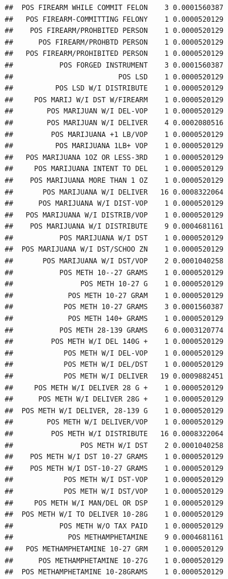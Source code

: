 \documentclass[]{book}
\begin{document}
\begin{verbatim}
##  POS FIREARM WHILE COMMIT FELON    3 0.0001560387
##   POS FIREARM-COMMITTING FELONY    1 0.0000520129
##    POS FIREARM/PROHBITED PERSON    1 0.0000520129
##      POS FIREARM/PROHBTD PERSON    1 0.0000520129
##   POS FIREARM/PROHIBITED PERSON    1 0.0000520129
##           POS FORGED INSTRUMENT    3 0.0001560387
##                         POS LSD    1 0.0000520129
##          POS LSD W/I DISTRIBUTE    1 0.0000520129
##     POS MARIJ W/I DST W/FIREARM    1 0.0000520129
##        POS MARIJUAN W/I DEL-VOP    1 0.0000520129
##        POS MARIJUAN W/I DELIVER    4 0.0002080516
##         POS MARIJUANA +1 LB/VOP    1 0.0000520129
##          POS MARIJUANA 1LB+ VOP    1 0.0000520129
##   POS MARIJUANA 1OZ OR LESS-3RD    1 0.0000520129
##     POS MARIJUANA INTENT TO DEL    1 0.0000520129
##    POS MARIJUANA MORE THAN 1 OZ    1 0.0000520129
##       POS MARIJUANA W/I DELIVER   16 0.0008322064
##      POS MARIJUANA W/I DIST-VOP    1 0.0000520129
##   POS MARIJUANA W/I DISTRIB/VOP    1 0.0000520129
##    POS MARIJUANA W/I DISTRIBUTE    9 0.0004681161
##           POS MARIJUANA W/I DST    1 0.0000520129
##  POS MARIJUANA W/I DST/SCHOO ZN    1 0.0000520129
##       POS MARIJUANA W/I DST/VOP    2 0.0001040258
##           POS METH 10--27 GRAMS    1 0.0000520129
##                POS METH 10-27 G    1 0.0000520129
##             POS METH 10-27 GRAM    1 0.0000520129
##            POS METH 10-27 GRAMS    3 0.0001560387
##             POS METH 140+ GRAMS    1 0.0000520129
##           POS METH 28-139 GRAMS    6 0.0003120774
##         POS METH W/I DEL 140G +    1 0.0000520129
##            POS METH W/I DEL-VOP    1 0.0000520129
##            POS METH W/I DEL/DST    1 0.0000520129
##            POS METH W/I DELIVER   19 0.0009882451
##     POS METH W/I DELIVER 28 G +    1 0.0000520129
##      POS METH W/I DELIVER 28G +    1 0.0000520129
##  POS METH W/I DELIVER, 28-139 G    1 0.0000520129
##        POS METH W/I DELIVER/VOP    1 0.0000520129
##         POS METH W/I DISTRIBUTE   16 0.0008322064
##                POS METH W/I DST    2 0.0001040258
##    POS METH W/I DST 10-27 GRAMS    1 0.0000520129
##    POS METH W/I DST-10-27 GRAMS    1 0.0000520129
##            POS METH W/I DST-VOP    1 0.0000520129
##            POS METH W/I DST/VOP    1 0.0000520129
##     POS METH W/I MAN/DEL OR DSP    1 0.0000520129
##  POS METH W/I TO DELIVER 10-28G    1 0.0000520129
##           POS METH W/O TAX PAID    1 0.0000520129
##             POS METHAMPHETAMINE    9 0.0004681161
##   POS METHAMPHETAMINE 10-27 GRM    1 0.0000520129
##      POS METHAMPHETAMINE 10-27G    1 0.0000520129
##  POS METHAMPHETAMINE 10-28GRAMS    1 0.0000520129

\end{verbatim}
\end{document}
